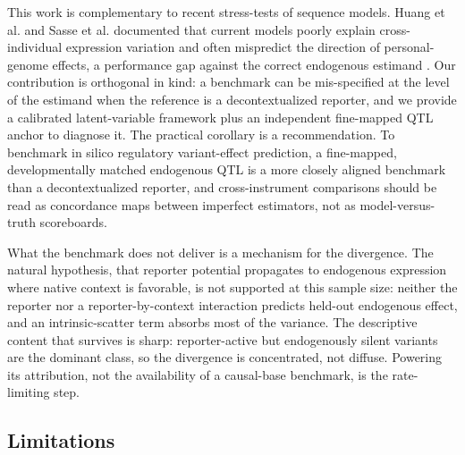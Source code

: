 \documentclass[9pt,twocolumn]{article}
\begin{document}
This work is complementary to recent stress-tests of sequence models. Huang et al. and Sasse et al. documented that current models poorly explain cross-individual expression variation and often mispredict the direction of personal-genome effects, a performance gap against the correct endogenous estimand \cite{r17,r18}. Our contribution is orthogonal in kind: a benchmark can be mis-specified at the level of the estimand when the reference is a decontextualized reporter, and we provide a calibrated latent-variable framework plus an independent fine-mapped QTL anchor to diagnose it. The practical corollary is a recommendation. To benchmark in silico regulatory variant-effect prediction, a fine-mapped, developmentally matched endogenous QTL is a more closely aligned benchmark than a decontextualized reporter, and cross-instrument comparisons should be read as concordance maps between imperfect estimators, not as model-versus-truth scoreboards.

What the benchmark does not deliver is a mechanism for the divergence. The natural hypothesis, that reporter potential propagates to endogenous expression where native context is favorable, is not supported at this sample size: neither the reporter nor a reporter-by-context interaction predicts held-out endogenous effect, and an intrinsic-scatter term absorbs most of the variance. The descriptive content that survives is sharp: reporter-active but endogenously silent variants are the dominant class, so the divergence is concentrated, not diffuse. Powering its attribution, not the availability of a causal-base benchmark, is the rate-limiting step.


\subsection{Limitations}
\end{document}
